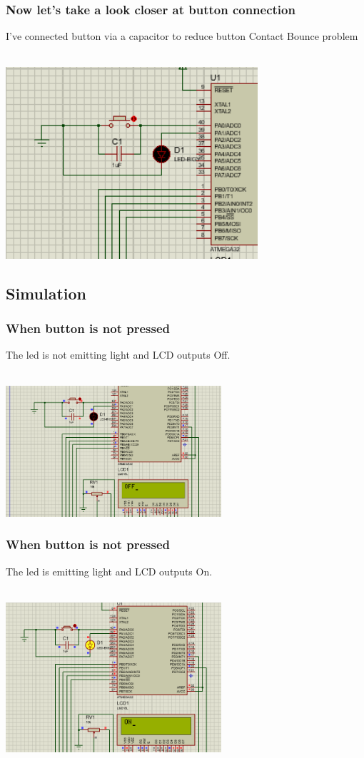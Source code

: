 \subsubsection{Now let's take a look closer at button connection}
I've connected button via a capacitor to reduce button Contact Bounce problem\\\\
\centerline{
	\includegraphics[width=0.7\textwidth]{solution/images/schematics2.png}
}


\subsection{Simulation}
\subsubsection{When button is not pressed}
The led is not emitting light and LCD outputs Off. \\\\

\centerline{
	\includegraphics[width=0.6\textwidth]{solution/images/result1.png}
}

\subsubsection{When button is not pressed}
The led is emitting light and LCD outputs On. \\\\

\centerline{
	\includegraphics[width=0.6\textwidth]{solution/images/result2.png}
}

